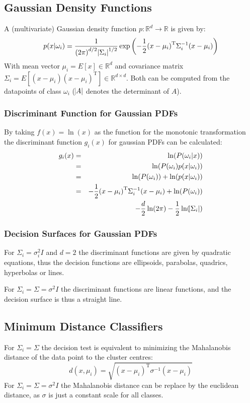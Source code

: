 \subsection{Gaussian Density Functions}
A (multivariate) Gaussian density function $p: \mathbb{R}^d \to \mathbb{R}$ is given by:
\begin{equation*}
    p(x|\omega_i) = \frac{1}{{(2 \pi)}^{d/2} \abs{\Sigma_i}^{1/2}} \exp \left(-\frac{1}{2} {(x - \mu_i)}^\text{T} \Sigma^{-1}_i {(x - \mu_i)} \right)
\end{equation*}
With mean vector $\mu_i = E[x] \in \mathbb{R}^d$ and covariance matrix $\Sigma_i = E[(x - \mu_i){(x - \mu_i)}^\text{T}] \in \mathbb{R}^{d \times d}$. Both can be computed from the datapoints of class $\omega_i$ ($\abs{A}$ denotes the determinant of $A$).

\subsubsection{Discriminant Function for Gaussian PDFs}
By taking $f(x) = \ln(x)$ as the function for the monotonic transformation the discriminant function $g_i(x)$ for gaussian PDFs can be calculated:
\begin{eqnarray*}
    g_i(x) &=& \ln(P(\omega_i | x)) \\
        &=& \ln(P(\omega_i) p(x|\omega_i)) \\
        &=& \ln(P(\omega_i)) + \ln(p(x|\omega_i)) \\
        &=& -\frac{1}{2} {(x - \mu_i)}^\text{T} \Sigma_i^{-1} (x - \mu_i) + \ln(P(\omega_i)) \\
        && - \frac{d}{2} \ln(2 \pi) - \frac{1}{2} \ln(\abs{\Sigma_i})
\end{eqnarray*}

\subsubsection{Decision Surfaces for Gaussian PDFs}
For $\Sigma_i = \sigma_i^2 I$ and $d = 2$ the discriminant functions are given by quadratic equations, thus the decision functions are ellipsoids, parabolas, quadrics, hyperbolas or lines.

For $\Sigma_i = \Sigma = \sigma^2 I$ the discriminant functions are linear functions, and the decision surface is thus a straight line.

\subsection{Minimum Distance Classifiers}
For $\Sigma_i = \Sigma$ the decision test is equivalent to minimizing the Mahalanobis distance of the data point to the cluster centres:
\begin{equation*}
    d(x, \mu_i) = \sqrt{{(x - \mu_i)}^\text{T} \sigma^{-1} (x-\mu_i)}
\end{equation*}
For $\Sigma_i = \Sigma = \sigma^2 I$ the Mahalanobis distance can be replace by the euclidean distance, as $\sigma$ is just a constant scale for all classes.

